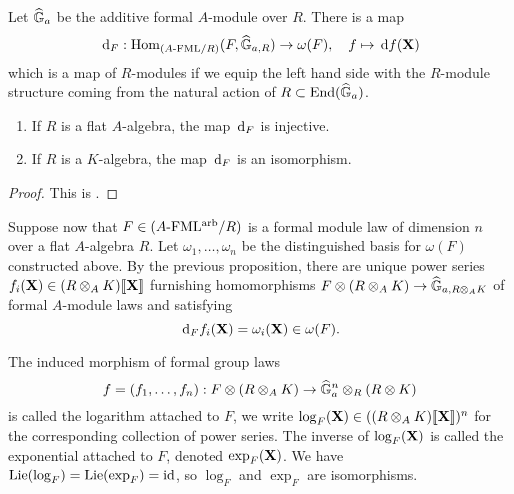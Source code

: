 \documentclass[../main.tex]{subfiles}
\begin{document}
Let $\widehat{\mathbb{G}}_a$ be the additive formal $A$-module over $R$. There is a map
\begin{equation} \label{eq:functorinvdifftohom}
  \, \mathrm{d}_{F} : \operatorname{Hom}_{{({A}\text-\allowbreak\mathrm{FML}/{R})}} ({F}, \widehat{\mathbb{G}}_{a,R}) \to \omega({F}), \quad f \mapsto \, \mathrm{d} f(\mathbf{X})
\end{equation}
which is a map of $R$-modules if we equip the left hand side with the $R$-module
structure coming from the natural action of $R \subset \operatorname{End}(\widehat{\mathbb{G}}_a)$. 
\begin{prop}\label{prop:loginvdiff}
  \begin{enumerate}
    \item If $R$ is a flat $A$-algebra, the map $\, \mathrm{d}_F$ is injective.
    \item If $R$ is a $K$-algebra, the map $\, \mathrm{d}_F$ is an isomorphism.
  \end{enumerate}
\begin{proof}
  This is \cite[Proposition 3.2]{hopkins1994equivariant}.
\end{proof}
\end{prop}

Suppose now that $F \in {({A}\text-\allowbreak\mathrm{FML^{arb}}/{R})}$ is a formal module law of dimension $n$
over a flat $A$-algebra $R$. 
Let $\omega_1, \dots, \omega_n$ be the distinguished basis for $\omega(F)$
constructed above. 
By the previous proposition, there are unique power series 
$f_i(\mathbf{X}) \in (R \otimes_A K)\llbracket \mathbf{X} \rrbracket$ furnishing homomorphisms
$F \otimes (R \otimes_A K) \to \widehat{\mathbb{G}}_{a,R\otimes_AK}$ of formal $A$-module laws
and satisfying
\begin{equation*}
  \, \mathrm{d}_F f_i(\mathbf{X}) = \omega_i(\mathbf{X}) \in \omega(F).
\end{equation*}
\begin{defi}
  The induced morphism of formal group laws
  \begin{equation*}
    f = (f_1, \dots, f_n) : F \otimes (R \otimes_A K) \to \widehat{\mathbb{G}}_a^n \otimes_R (R \otimes K)
  \end{equation*}
  is called the logarithm attached to $F$, we write 
  $\log_F(\mathbf{X}) \in ((R \otimes_A K)\llbracket \mathbf{X} \rrbracket)^n$ for the corresponding collection
  of power series. The inverse of $\log_F(\mathbf{X})$ is called the exponential 
  attached to $F$, denoted $\exp_F(\mathbf{X})$. We have $\operatorname{Lie}(\log_F) = \operatorname{Lie}(\exp_F) = \operatorname{id}$,
  so $\log_F$ and $\exp_F$ are isomorphisms.
\end{defi}
\end{document}
